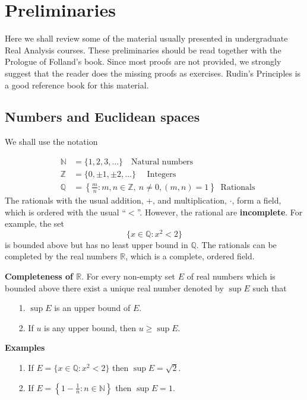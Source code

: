 \documentclass[12pt]{report}
\begin{document}
\chapter{Preliminaries}\label{c:1}

\vspace{4mm}
\noindent
Here we shall review some of the material usually presented
in undergraduate Real Analysis courses. These
preliminaries  should  be read together with the
Prologue of Folland's book. Since most proofs are not provided,
we strongly suggest that the reader does the missing proofs
as exercises.  Rudin's  Principles is a good reference book for this
material.



\section{Numbers and Euclidean spaces} \label{s1:1} 
We shall use the notation

\begin{eqnarray*} &\mathbb{N}& = \{1, 2, 3, \dots\} \quad \mbox{
Natural numbers}\\ &\mathbb{Z}& = \{0, \pm 1, \pm 2, \dots \} \quad
\mbox{ Integers}\\ &\mathbb{Q}& = \left \{\frac{m}{n}: m, n \in
\mathbb{Z}, \ n \ne 0, (m, n) = 1\right \} \
\mbox{ Rationals}
\end{eqnarray*} The rationals with the usual addition, +, and
multiplication, $\cdot$, form a field, which is ordered with the usual
``$<$''.  However, the rational are
\textbf{incomplete}.  For example, the set
\[
\{x \in \mathbb{Q}: x^2 < 2\}
\] is bounded above but has no least upper bound in $\mathbb{Q}$. 
The rationals can be completed by the real numbers $\mathbb{R}$,
which is a complete, ordered field.

\bigskip
\noindent
\textbf{Completeness of $\mathbb{R}$}.  For every non-empty set
$E$ of real numbers which is bounded above there exist a unique real
number denoted by
$\sup E$ such that 

\begin{itemize}
\item[1.]  $\sup E$ is an upper bound of $E$.
\item[2.]  If $u$ is any upper bound, then $u \ge \sup E$.
\end{itemize}

\medskip
\noindent
\textbf{Examples} 

\begin{itemize}
\item[1.] If $E = \{x \in \mathbb{Q}: x^2 < 2\}$ then $\sup E = \sqrt{2}$.
\item[2.] If $E = \left \{1 - \frac{1}{n}: n \in \mathbb{N}\right \}$ then
$\sup E = 1$.
\end{itemize}
\end{document}
